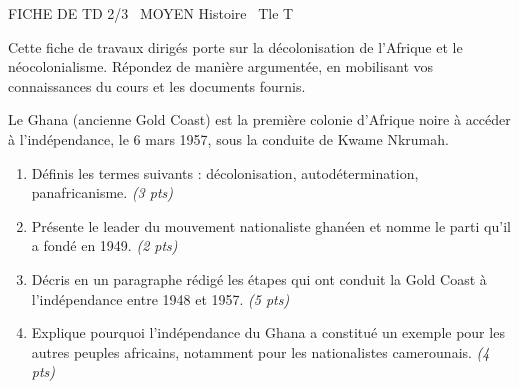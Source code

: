 \documentclass[11pt]{article}
\begin{document}
\begin{tcolorbox}[enhanced,colback=popink,colframe=popink,arc=10pt,boxrule=0pt,left=12pt,right=12pt,top=9pt,bottom=9pt]
{\color{white}\popxbold\small FICHE DE TD 2/3 \textbullet\ MOYEN \hfill Histoire \textbullet\ Tle T\par}
\end{tcolorbox}
\vspace{4pt}
Cette fiche de travaux dirigés porte sur la décolonisation de l'Afrique et le néocolonialisme. Répondez de manière argumentée, en mobilisant vos connaissances du cours et les documents fournis.

\begin{exercice}
Le Ghana (ancienne Gold Coast) est la première colonie d'Afrique noire à accéder à l'indépendance, le 6 mars 1957, sous la conduite de Kwame Nkrumah.
\begin{enumerate}
\item Définis les termes suivants : décolonisation, autodétermination, panafricanisme. \textit{(3 pts)}
\item Présente le leader du mouvement nationaliste ghanéen et nomme le parti qu'il a fondé en 1949. \textit{(2 pts)}
\item Décris en un paragraphe rédigé les étapes qui ont conduit la Gold Coast à l'indépendance entre 1948 et 1957. \textit{(5 pts)}
\item Explique pourquoi l'indépendance du Ghana a constitué un exemple pour les autres peuples africains, notamment pour les nationalistes camerounais. \textit{(4 pts)}
\end{enumerate}
\end{exercice}
\end{document}
